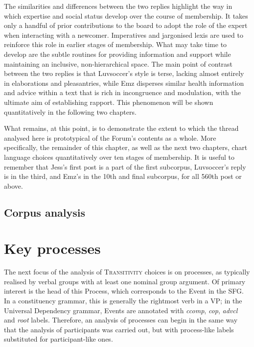 \documentclass{article}
\begin{document}


The similarities and differences between the two replies highlight the way in which expertise and social status develop over the course of membership. It takes only a handful of prior contributions to the board to adopt the role of the expert when interacting with a newcomer. Imperatives and jargonised lexis are used to reinforce this role in earlier stages of membership. What may take time to develop are the subtle routines for providing information and support while maintaining an inclusive, non-hierarchical space. The main point of contrast between the two replies is that Luvsoccer's style is terse, lacking almost entirely in elaborations and pleasantries, while Emz disperses similar health information and advice within a text that is rich in incongruence and modulation, with the ultimate aim of establishing rapport. This phenomenon will be shown quantitatively in the following two chapters.

What remains, at this point, is to demonstrate the extent to which the thread analysed here is prototypical of the Forum's contents as a whole. More specifically, the remainder of this chapter, as well as the next two chapters, chart language choices quantitatively over ten stages of membership. It is useful to remember that Jess's first post is a part of the first subcorpus, Luvsoccer's reply is in the third, and Emz's in the 10th and final subcorpus, for all 560th post or above.



\subsection{Corpus analysis}


\section{Key processes} 

The next focus of the analysis of \textsc{Transitivity} choices is on processes, as typically realised by verbal groups with at least one nominal group argument. Of primary interest is the head of this Process, which corresponds to the Event in the SFG. In a constituency grammar, this is generally the rightmost verb in a VP; in the Universal Dependency grammar, Events are annotated with \emph{ccomp}, \emph{cop}, \emph{advcl} and \emph{root} labels. Therefore, an analysis of processes can begin in the same way that the analysis of participants was carried out, but with process-like labels substituted for participant-like ones.
\end{document}
